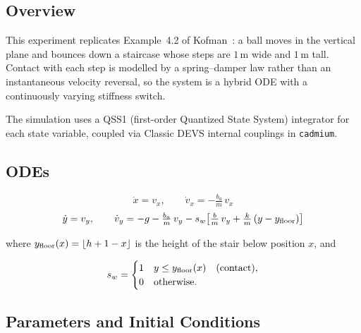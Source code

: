 
\subsection*{Overview}

This experiment replicates Example~4.2 of Kofman~\cite{K04}: a ball
moves in the vertical plane and bounces down a staircase whose steps
are $1\,\text{m}$ wide and $1\,\text{m}$ tall.  Contact with each
step is modelled by a spring--damper law rather than an instantaneous
velocity reversal, so the system is a hybrid ODE with a continuously
varying stiffness switch.

The simulation uses a QSS1 (first-order Quantized State System)
integrator for each state variable, coupled via Classic DEVS internal
couplings in \texttt{cadmium}.

\subsection*{ODEs}

\[
  \dot{x}  = v_x,\qquad
  \dot{v}_x = -\tfrac{b_a}{m}\,v_x
\]
\[
  \dot{y}  = v_y,\qquad
  \dot{v}_y = -g
    - \tfrac{b_a}{m}\,v_y
    - s_w\!\left[\tfrac{b}{m}\,v_y + \tfrac{k}{m}\,(y - y_{\rm floor})\right]
\]

where $y_{\rm floor}(x) = \lfloor h + 1 - x \rfloor$ is the height of
the stair below position $x$, and

\[
  s_w =
  \begin{cases}
    1 & y \le y_{\rm floor}(x) \quad\text{(contact)}, \\
    0 & \text{otherwise}.
  \end{cases}
\]

\subsection*{Parameters and Initial Conditions}

